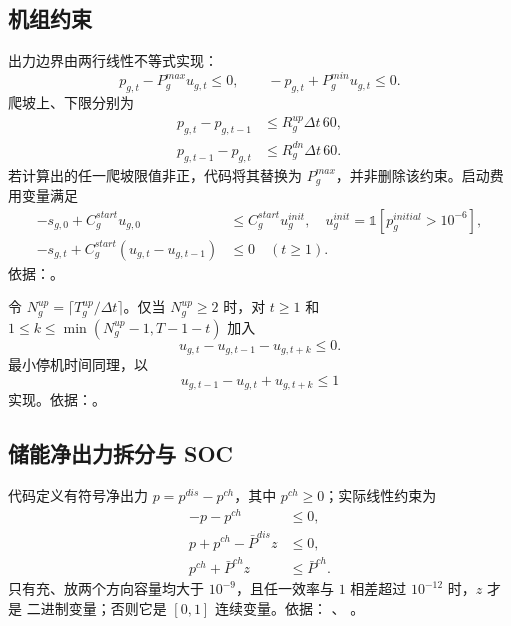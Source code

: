\subsection{机组约束}
出力边界由两行线性不等式实现：
\begin{equation}
 p_{g,t}-P_g^{max}u_{g,t}\le0,\qquad
 -p_{g,t}+P_g^{min}u_{g,t}\le0.
\end{equation}
爬坡上、下限分别为
\begin{align}
 p_{g,t}-p_{g,t-1}&\le R_g^{up}\Delta t\,60,\\
 p_{g,t-1}-p_{g,t}&\le R_g^{dn}\Delta t\,60.
\end{align}
若计算出的任一爬坡限值非正，代码将其替换为 $P_g^{max}$，并非删除该约束。启动费用变量满足
\begin{align}
 -s_{g,0}+C_g^{start}u_{g,0}&\le C_g^{start}u_g^{init},
 \quad u_g^{init}=\mathbb 1[p_g^{initial}>10^{-6}],\\
 -s_{g,t}+C_g^{start}(u_{g,t}-u_{g,t-1})&\le0\quad(t\ge1).
\end{align}
依据：。

令 $N_g^{up}=\lceil T_g^{up}/\Delta t\rceil$。仅当 $N_g^{up}\ge2$ 时，对
$t\ge1$ 和 $1\le k\le\min(N_g^{up}-1,T-1-t)$ 加入
\begin{equation}
 u_{g,t}-u_{g,t-1}-u_{g,t+k}\le0.
\end{equation}
最小停机时间同理，以
\begin{equation}
 u_{g,t-1}-u_{g,t}+u_{g,t+k}\le1
\end{equation}
实现。依据：。

\subsection{储能净出力拆分与 SOC}
代码定义有符号净出力 $p=p^{dis}-p^{ch}$，其中 $p^{ch}\ge0$；实际线性约束为
\begin{align}
 -p-p^{ch}&\le0,\\
 p+p^{ch}-\bar P^{dis}z&\le0,\\
 p^{ch}+\bar P^{ch}z&\le\bar P^{ch}.
\end{align}
只有充、放两个方向容量均大于 $10^{-9}$，且任一效率与 $1$ 相差超过 $10^{-12}$ 时，$z$ 才是
二进制变量；否则它是 $[0,1]$ 连续变量。依据：
、
。

